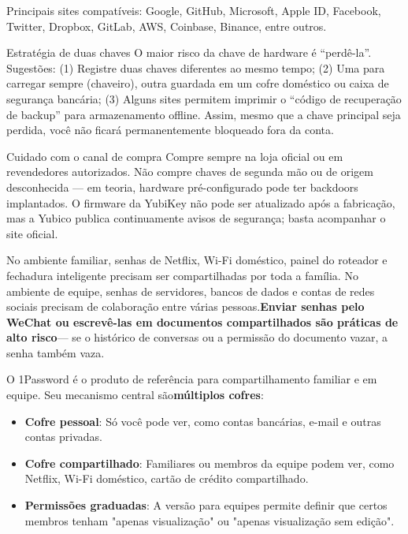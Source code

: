 Principais sites compatíveis: Google, GitHub, Microsoft, Apple ID, Facebook, Twitter, Dropbox, GitLab, AWS, Coinbase, Binance, entre outros.

\begin{tcbinfo}{Estratégia de duas chaves}
O maior risco da chave de hardware é “perdê-la”. Sugestões: (1) Registre duas chaves diferentes ao mesmo tempo; (2) Uma para carregar sempre (chaveiro), outra guardada em um cofre doméstico ou caixa de segurança bancária; (3) Alguns sites permitem imprimir o “código de recuperação de backup” para armazenamento offline. Assim, mesmo que a chave principal seja perdida, você não ficará permanentemente bloqueado fora da conta.

\end{tcbinfo}

\begin{tcbwarn}{Cuidado com o canal de compra}
Compre sempre na loja oficial ou em revendedores autorizados. Não compre chaves de segunda mão ou de origem desconhecida — em teoria, hardware pré-configurado pode ter backdoors implantados. O firmware da YubiKey não pode ser atualizado após a fabricação, mas a Yubico publica continuamente avisos de segurança; basta acompanhar o site oficial.

\end{tcbwarn}


No ambiente familiar, senhas de Netflix, Wi-Fi doméstico, painel do roteador e fechadura inteligente precisam ser compartilhadas por toda a família. No ambiente de equipe, senhas de servidores, bancos de dados e contas de redes sociais precisam de colaboração entre várias pessoas.\textbf{Enviar senhas pelo WeChat ou escrevê-las em documentos compartilhados são práticas de alto risco}— se o histórico de conversas ou a permissão do documento vazar, a senha também vaza.


O 1Password é o produto de referência para compartilhamento familiar e em equipe. Seu mecanismo central são\textbf{múltiplos cofres}:

\begin{itemize}
  \item \textbf{Cofre pessoal}: Só você pode ver, como contas bancárias, e-mail e outras contas privadas.
  \item \textbf{Cofre compartilhado}: Familiares ou membros da equipe podem ver, como Netflix, Wi-Fi doméstico, cartão de crédito compartilhado.
  \item \textbf{Permissões graduadas}: A versão para equipes permite definir que certos membros tenham "apenas visualização" ou "apenas visualização sem edição".
\end{itemize}

